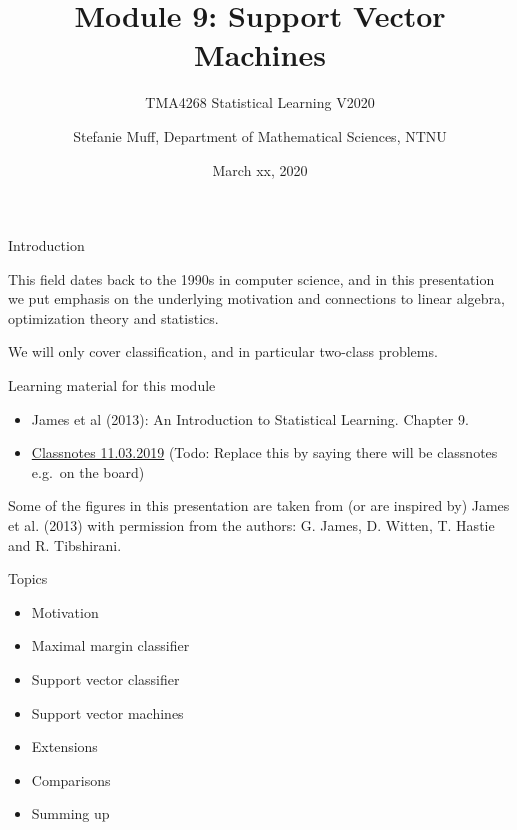 \documentclass[10pt,ignorenonframetext,]{beamer}
\title{Module 9: Support Vector Machines}
\subtitle{TMA4268 Statistical Learning V2020}
\author{Stefanie Muff, Department of Mathematical Sciences, NTNU}
\date{March xx, 2020}
\providecommand{\tightlist}{%
  \setlength{\itemsep}{0pt}\setlength{\parskip}{0pt}}
\begin{document}
\frame{\titlepage}

\begin{frame}{Introduction}

This field dates back to the 1990s in computer science, and in this
presentation we put emphasis on the underlying motivation and
connections to linear algebra, optimization theory and statistics.

We will only cover classification, and in particular two-class problems.

\begin{block}{Learning material for this module}

\begin{itemize}
\tightlist
\item
  James et al (2013): An Introduction to Statistical Learning. Chapter
  9.\\
\item
  \href{https://www.math.ntnu.no/emner/TMA4268/2019v/notes/M9notes.pdf}{Classnotes
  11.03.2019} (Todo: Replace this by saying there will be classnotes
  e.g.~on the board)
\end{itemize}

\vspace{2mm} \small
Some of the figures in this presentation are taken from (or are inspired
by) James et al. (2013) with permission from the authors: G. James, D.
Witten, T. Hastie and R. Tibshirani.

\end{block}

\end{frame}

\begin{frame}

\begin{block}{Topics}

\begin{itemize}
\tightlist
\item
  Motivation
\item
  Maximal margin classifier
\item
  Support vector classifier
\item
  Support vector machines
\item
  Extensions
\item
  Comparisons
\item
  Summing up
\end{itemize}

\end{block}

\end{frame}
\end{document}
